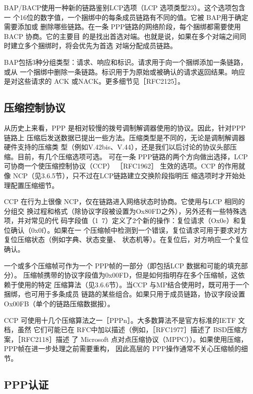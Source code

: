 BAP/BACP使用一种新的链路鉴别LCP选项（LCP 选项类型23）。这个选项包含一
个16位的数字值，一个捆绑中的每条成员链路有不同的值。它被 BAP用于确定需要添加或
删除哪些链路。在一条 PPP链路的网络阶段，每个捆绑都需要使用BACP 协商。它的主要目
的是找出首选对端。也就是说，如果在多个对端之间同时建立多个捆绑时，将会优先为首选
对端分配成员链路。

BAP包括3种分组类型：请求、响应和标识。请求用于向一个捆绑添加一条链路，或从
一个捆绑中删除一条链路。标识用于为原始或被确认的请求返回结果。响应是对这些请求的
ACK 或NACK。更多细节见［RFC2125］。

\subsection{压缩控制协议}

从历史上来看，PPP 是相对较慢的拨号调制解调器使用的协议。因此，针对PPP链路上
压缩后发送数据已提出一些方法。压缩类型是不同的，无论是调制解调器硬件支持的压缩类
型（例如V.42bis、V.44），还是我们以后讨论的协议头部压缩。目前，有几个压缩选项可选。
可在一条 PPP链路的两个方向做出选择，LCP 可协商一个使压缩控制协议（CCP） ［RFC1962］
生效的选项。CCP 的作用就像 NCP（见3.6.5节），只不过在LCP链路建立交换阶段指明压
缩选项时才开始处理配置压缩细节。

CCP 在行为上很像 NCP，仅在链路进入网络状态时协商。它使用与LCP 相同的分组交
换过程和格式（除协议字段被设置为Ox80FD之外），另外还有一些特殊选项，并对常见的代
码字段值（1~7）定义了2个新的操作：复位请求（Ox0e）和复位确认（0x0f）。如果在一
个压缩帧中检测到一个错误，复位请求可用于要求对方复位压缩状态（例如字典、状态变量、
状态机等）。在复位后，对方响应一个复位确认。

一个或多个压缩帧可作为一个 PPP帧的一部分（即包括LCP 数据和可能的填充部分）。
压缩帧携带的协议字段值为0x00FD，但是如何指明存在多个压缩帧，这依赖于使用的特定
压缩算法（见3.6.6节）。当CCP 与MP结合使用时，既可用于一个捆绑，也可用于多条成员
链路的某些组合。如果只用于成员链路，协议字段设置 Ox00FB（单个的链路压缩数据报）。

CCP 可使用十几个压缩算法之一［PPPn］。大多数算法不是官方标准的IETF 文档，虽然
它们可能已在 RFC中加以描述（例如，［RFC1977］描述了 BSD压缩方案，［RFC2118］描述
了 Microsoft 点对点压缩协议（MPPC））。如果使用压缩，PPP帧在进一步处理之前需要重构，
因此高层的 PPP操作通常不关心压缩帧的细节。

\subsection{PPP认证}

